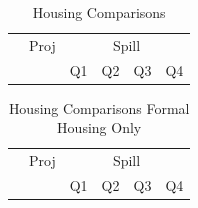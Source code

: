 \documentclass[12pt]{article}
\begin{document}
\begin{table}[h!]
	\centering
	\caption{Housing Comparisons}
\vspace{-2mm}
\begin{tabular}{l*{1}{ccccc}}
\toprule
& Proj & \multicolumn{4}{c}{ Spill} \\
&  & Q1 & Q2 & Q3 &Q4 \\
\midrule
 
\bottomrule
\end{tabular}
\end{table}



\begin{table}[h!]
	\centering
	\caption{Housing Comparisons Formal Housing Only}
\vspace{-2mm}
\begin{tabular}{l*{1}{ccccc}}
\toprule
& Proj & \multicolumn{4}{c}{ Spill} \\
&  & Q1 & Q2 & Q3 &Q4 \\
\midrule
 
\bottomrule
\end{tabular}
\end{table}
\end{document}
